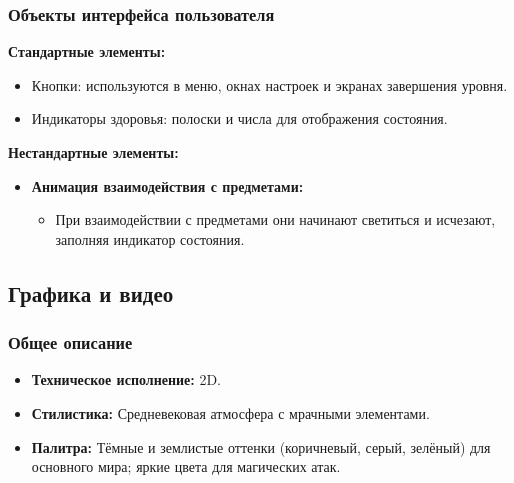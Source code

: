 \documentclass{article}
\begin{document}
\subsubsection{Объекты интерфейса пользователя}
\textbf{Стандартные элементы:}
\begin{itemize}
    \item Кнопки: используются в меню, окнах настроек и экранах завершения уровня.
    \item Индикаторы здоровья: полоски и числа для отображения состояния.
\end{itemize}

\textbf{Нестандартные элементы:}
\begin{itemize}
    \item \textbf{Анимация взаимодействия с предметами:}
    \begin{itemize}
        \item При взаимодействии с предметами они начинают светиться и исчезают, заполняя индикатор состояния.
    \end{itemize}
\end{itemize}
\subsection{Графика и видео}

\subsubsection{Общее описание}
\begin{itemize}
    \item \textbf{Техническое исполнение:} 2D.
    \item \textbf{Стилистика:} Средневековая атмосфера с мрачными элементами.
    \item \textbf{Палитра:} Тёмные и землистые оттенки (коричневый, серый, зелёный) для основного мира; яркие цвета для магических атак.
\end{itemize}
\end{document}
